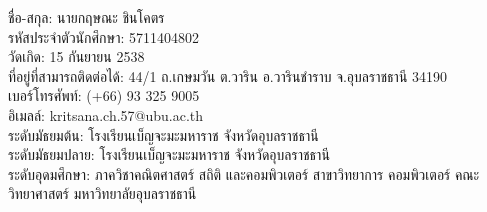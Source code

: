 {\begin{biography}
\justify
ชื่อ-สกุล: นายกฤษณะ ชินโคตร \\
รหัสประจำตัวนักศึกษา: 5711404802\\
วัดเกิด: 15 กันยายน 2538\\
ที่อยู่ที่สามารถติดต่อได้: 44/1 ถ.เกษมวัน ต.วาริน อ.วารินชำราบ จ.อุบลราชธานี 34190\\
เบอร์โทรศัพท์: (+66) 93 325 9005\\
อิเมลล์: kritsana.ch.57@ubu.ac.th\\
ระดับมัธยมต้น: โรงเรียนเบ็ญจะมะมหาราช จังหวัดอุบลราชธานี\\
ระดับมัธยมปลาย: โรงเรียนเบ็ญจะมะมหาราช จังหวัดอุบลราชธานี\\
ระดับอุดมศึกษา: ภาควิชาคณิตศาสตร์ สถิติ และคอมพิวเตอร์ สาขาวิทยาการ
คอมพิวเตอร์ คณะวิทยาศาสตร์ มหาวิทยาลัยอุบลราชธานี

\end{biography}}
